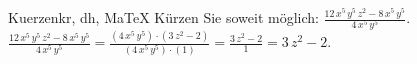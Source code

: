 \begin{MAufgabe}{Kuerzen}{kr, dh, MaTeX}
K\"urzen Sie soweit m\"oglich: $\frac{12\, x^5\, y^5\, z^2 - 8\, x^5\, y^5}{4\, x^5\, y^5}$.\\ 
\ifLsg\MLoesung
\quad $\frac{12\, x^5\, y^5\, z^2 - 8\, x^5\, y^5}{4\, x^5\, y^5}=\frac{(4\, x^5\, y^5)\cdot(3\, z^2 - 2)}{(4\, x^5\, y^5)\cdot(1)}=\frac{3\, z^2 - 2}{1}=3\, z^2 - 2$.\else\relax\fi
 \end{MAufgabe}